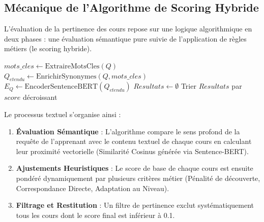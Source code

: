 \documentclass[12pt,a4paper]{report}
\begin{document}
\subsection{Mécanique de l'Algorithme de Scoring Hybride}

L'évaluation de la pertinence des cours repose sur une logique algorithmique en deux phases : une évaluation sémantique pure suivie de l'application de règles métiers (le scoring hybride).

\begin{algorithm}[H]
\caption{\textcolor{primaryblue}{\textbf{Algorithme de Recommandation Hybride (LearnAgent)}}}
$mots\_cles \leftarrow \text{ExtraireMotsCles}(Q)$\;
$Q_{etendu} \leftarrow \text{EnrichirSynonymes}(Q, mots\_cles)$\;
$E_Q \leftarrow \text{EncoderSentenceBERT}(Q_{etendu})$\;
$Resultats \leftarrow \emptyset$\;
Trier $Resultats$ par $score$ décroissant\;
\;
\end{algorithm}

Le processus textuel s'organise ainsi :
\begin{enumerate}
    \item \textbf{Évaluation Sémantique} : L'algorithme compare le sens profond de la requête de l'apprenant avec le contenu textuel de chaque cours en calculant leur proximité vectorielle (Similarité Cosinus générée via Sentence-BERT).
    \item \textbf{Ajustements Heuristiques} : Le score de base de chaque cours est ensuite pondéré dynamiquement par plusieurs critères métier (Pénalité de découverte, Correspondance Directe, Adaptation au Niveau).
    \item \textbf{Filtrage et Restitution} : Un filtre de pertinence exclut systématiquement tous les cours dont le score final est inférieur à 0.1.
\end{enumerate}
\end{document}
